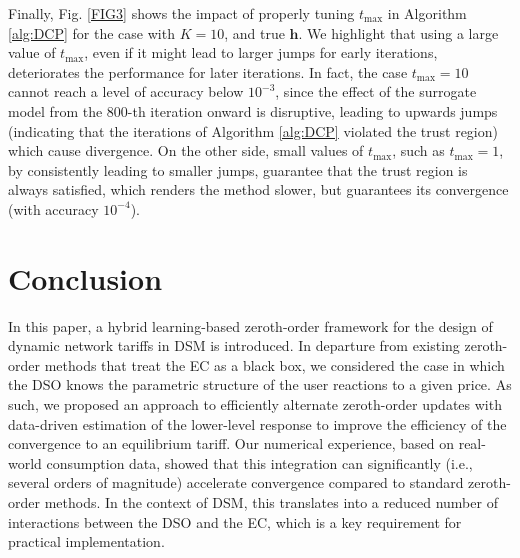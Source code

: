 \documentclass[letterpaper, 10 pt, conference]{ieeeconf}
\begin{document}
Finally, Fig. \ref{FIG3} shows the impact of properly tuning $t_\mathrm{max}$ in Algorithm \ref{alg:DCP} for the case with $K=10$, and true $\mathbf{h}$. We highlight that using a large value of $t_\mathrm{max}$, even if it might lead to larger jumps for early iterations, deteriorates the performance for later iterations. In fact, the case $t_\mathrm{max}=10$ cannot reach a level of accuracy below $10^{-3}$, since the effect of the surrogate model from the $800$-th iteration onward is disruptive, leading to upwards jumps (indicating that the iterations of Algorithm \ref{alg:DCP} violated the trust region) which cause divergence. On the other side, small values of $t_\mathrm{max}$, such as $t_\mathrm{max}=1$, by consistently leading to smaller jumps, guarantee that the trust region is always satisfied, which renders the method slower, but guarantees its convergence (with accuracy $10^{-4}$). 
\section{Conclusion}\label{Conclusion}
In this paper, a hybrid learning-based zeroth-order framework for the design of dynamic network tariffs in DSM is introduced. In departure from existing zeroth-order methods that treat the EC as a black box, we considered the case in which the DSO knows the parametric structure of the user reactions to a given price. As such, we proposed an approach to efficiently alternate zeroth-order updates with data-driven estimation of the lower-level response to improve the efficiency of the convergence to an equilibrium tariff. Our numerical experience, based on real-world consumption data, showed that this integration can significantly (i.e., several orders of magnitude) accelerate convergence compared to standard zeroth-order methods. In the context of DSM, this translates into a reduced number of interactions between the DSO and the EC, which is a key requirement for practical implementation.



\end{document}
